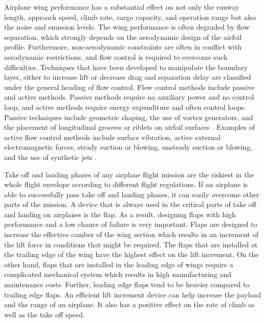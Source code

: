 \documentclass[fleqn,10pt]{SelfArx} %
\begin{document}
Airplane wing performance has a substantial effect on not only the runway length, approach speed, climb rate, cargo capacity, and operation range but also the noise and emission levels. The wing performance is often degraded by flow separation, which strongly depends on the aerodynamic design of the airfoil profile. Furthermore, non-aerodynamic constraints are often in conflict with aerodynamic restrictions, and flow control is required to overcome such difficulties. Techniques that have been developed to manipulate the boundary layer, either to increase  lift or decrease  drag and separation delay are classified under the general heading of flow control. Flow control methods include passive and active methods. Passive methods require no auxiliary power and no control loop, and active methods require energy expenditure and often control loops. Passive techniques include geometric shaping, the use of vortex generators, and the placement of longitudinal grooves or riblets on airfoil surfaces \cite{Shehata2017}. Examples of active flow control methods include surface vibration, active external electromagnetic forces, steady suction or blowing, unsteady suction or blowing, and the use of synthetic jets \cite{Bons2018}.

Take off and landing phases of any airplane flight mission are the riskiest  in the whole flight envelope according to different flight regulations. If an airplane is able to successfully pass take off and landing phases, it can easily overcome other parts of the mission. A device that is always used in the critical parts of take off and landing on airplanes is the flap. As a result, designing flaps with high performance and a low chance of failure is very important. Flaps are designed to increase the effective camber of the wing section which results in an increment of the lift force in conditions that might be required. The flaps that are installed at the trailing edge of the wing have the highest effect on the lift increment. On the other hand, flaps that are installed in the leading edge of wings require a complicated mechanical system which results in high manufacturing and maintenance costs. Further, leading edge flaps tend to be heavier compared to trailing edge flaps. An efficient lift increment device can help increase the payload and the range of an airplane. It also has a positive effect on the rate of climb as well as the take off speed.
\end{document}
